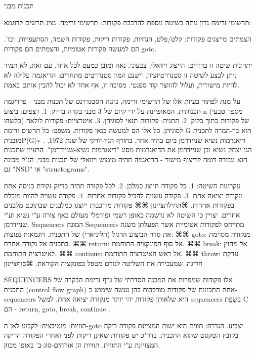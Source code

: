         תכנות מבני

        תרשימי זרימה
        נדון עתה בשיטה נוספת להרכבת פקודות: תרשימי זרימה. נציג תרשים לדוגמא:

        הצמתים מייצגים פקודות: קלט/פלט, הנחיות, פקודות ריקות, פקודות השמה, הסתעפויות, וכו'. הם למעשה פקודות אטומיות, והצמתים הם פקודות goto.

        יתרונות שיטה זו ברורים: הייצוג ויזואלי, צבעוני, נאה ומובן כמעט לכל אחד. עם זאת, לא תמיד ניתן לבצע לשיטה זו סטנדרטיזציה, וישנם המון סטנדרטים מתחרים; הדיאגמה עלולה לא להיות מישורית, ועלול להווצר קוד ספגטי. מסיבה זו, אף אחד לא יכול להבין אותם באמת.

        על מנת לפתור בעיות אלו של תרשימי זרימה, נהגה הסטנדרנט של תכנות מבני - פרדיגמה תכנותית, המאופיינת על ידי קיום של 3 מבני בקרה בדיוק:
        1. רצפים: ביצוע n (מספר טבעי כלשהו) של פקודות בתוך בלוק.
        2. התניה: פקודות תנאי לסוגיהן.
        3. איטרציות: פקודות לולאה לסוגיהן.
        כל אלו הם למעשה בנאי פקודות.
        משפט: כל תרשים זרימה G הוא בר-המרה לתכנית מובניתP(G)v .
        דיאגרמות נשיא שניידרמן
        ביום בהיר אחד, בחורף הניו-יורקי של שנת 1972, הגו יצחק נשיא ובן שניידרמן את הדיאגרמות מסוג "דיאגרמות נשיא-שניידרמן". הרעיון שתכנות הוא עבודה דומה לריצוף מישור - הדיאגמה תהיה מימוש ויזואלי של תכנות מבני. הנ"ל מכונה גם "NSD" או "structograms".

        עקרונות השיטה:
        1. כל פקודה תיוצג כמלבן.
        2. לכל פקודה תהיה בדיוק נקודת כניסה אחת ונקודת יציאה אחת.
        3. פקודה עשויה להכיל פקודות אחרות.
        4. פקודה עשויה להיות מוכלת בפקודות אחרות.
        ⌘תחילת{ציינון}
        ⌘⌘ פקודות מורכבות ייוצגו כמלבנים שבתוכם מלבנים אחרים.
        יצויין כי השיטה לא נרשמה באופן רשמי ופורמלי מעולם באף צורה ע"י נשיא וע"י שניידרמן.
        Sequencers
        המונח Sequencers מתייחס לפקודות אטומיות אשר הפעלתן משנה את סדר הביצוע הרגיל (הליניארי) של התכנית.
        דוגמאות נפוצות:
        ⌘⌘ goto: מנקודה מסוימת בתכנית אל נקודה אחרת.
        ⌘⌘ return: אל סוף הפונקציה התוחמת.
        ⌘⌘ break: אל מחוץ לאיטרציה התוחמת.
        ⌘⌘ continue: אל ראש האיטרציה התוחמת.
        ⌘⌘ throw: נזרקת חריגה, שמעבירה את השליטה לגורם מטפל בפונקציה הקוראת.
      ⌘סוף{ציינון}

        SEQUENCERS
        אלו פקודות שמפרות את המבנה הסדרתי של גרף זרימת הבקרה של התכנית
        (control flow graph) אחת התכונות של פקודות מורכבות בהן נעשה שימוש ב-sequencers היא שלאותן פקודות יהי יותר מנקודת יציאה אחת.
        למשל sequencers בִּשְׂפַת C הם - return, goto, break, continue .

        תוויות:
        מוטיבציה: לקבוע לאן ה-goto יצביע.
        הגדרה: תווית היא ישות המציינת פקודה ריקה בקובץ הטקסט שהוא התכנית. בדר"כ יש פקודות שאינן ריקות לפני ואחרי הפקודה הריקה המצויינת ע"י התווית.
        תוויות הן אזרחים-סוג-ב' באופן מכוון.

